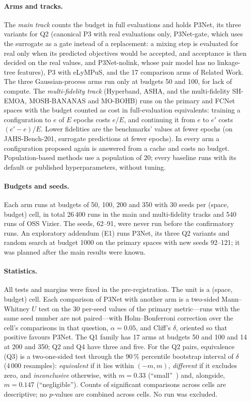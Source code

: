 \paragraph{Arms and tracks.} The \emph{main track} counts the budget in full evaluations and holds P3Net, its three
variants for Q2 (canonical P3 with real evaluations only, P3Net-gate, which uses the surrogate as a gate instead of
a replacement: a mixing step is evaluated for real only when its predicted objectives would be accepted, and
acceptance is then decided on the real values, and P3Net-nolink, whose pair model has no linkage-tree features), P3 with
eLyMPuS, and the 17 comparison arms of Related Work. The three Gaussian-process arms run only at budgets 50 and 100,
for lack of compute. The \emph{multi-fidelity track} (Hyperband, ASHA, and the multi-fidelity SH-EMOA, MOSH-BANANAS and
MO-BOHB) runs on the primary and FCNet spaces with the budget counted as cost in full-evaluation equivalents: training
a configuration to $e$ of $E$ epochs costs $e/E$, and continuing it from $e$ to $e'$ costs $(e'-e)/E$. Lower
fidelities are the benchmarks' values at fewer epochs (on JAHS-Bench-201, surrogate predictions at fewer epochs). In
every arm a configuration proposed again is answered from a cache and costs no budget. Population-based methods use a
population of 20; every baseline runs with its default or published hyperparameters, without tuning.

\paragraph{Budgets and seeds.} Each arm runs at budgets of 50, 100, 200 and 350 with 30 seeds per (space, budget)
cell, in total 26\,400 runs in the main and multi-fidelity tracks and 540 runs of OSS Vizier. The seeds, 62--91, were
never run before the confirmatory runs. An exploratory addendum (E1) runs P3Net, its three Q2 variants and random
search at budget 1000 on the primary spaces with new seeds 92--121; it was planned after the main results were known.

\paragraph{Statistics.} All tests and margins were fixed in the pre-registration. The unit is a (space, budget) cell.
Each comparison of P3Net with another arm is a two-sided Mann--Whitney $U$ test on the 30 per-seed values of the
primary metric---runs with the same seed number are not paired---with Holm--Bonferroni correction over the cell's
comparisons in that question, $\alpha = 0.05$, and Cliff's $\delta$, oriented so that positive favours P3Net. The Q1
family has 17 arms at budgets 50 and 100 and 14 at 200 and 350; Q2 and Q4 have three and five. For the Q2 pairs,
equivalence (Q3) is a two-one-sided test through the 90\,\% percentile bootstrap interval of $\delta$ (4\,000
resamples): \emph{equivalent} if it lies within $(-m, m)$, \emph{different} if it excludes zero, and
\emph{inconclusive} otherwise, with $m = 0.33$ (``small''~\citep{romano2006appropriate}) and, alongside, $m = 0.147$
(``negligible''). Counts of significant comparisons across cells are descriptive; no $p$-values are combined across
cells. No run was excluded.
